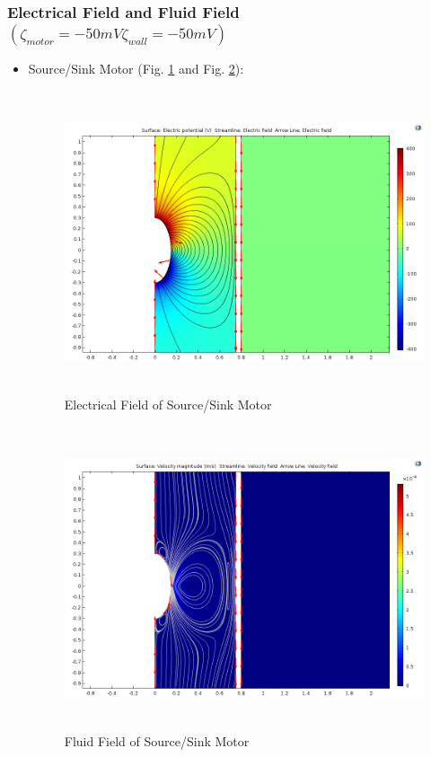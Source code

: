 \documentclass[fontsize=11pt, %
                             paper=a4, %
                             twoside, %
                             captions=tableheading,
                             index=totoc,
                             hyperref]{labbook}
\begin{document}
\begin{addmargin}[4cm]{0cm}
\subsubsection*{Electrical Field and Fluid Field $(\zeta_{motor}=-50mV \zeta_{wall}=-50 mV)$}
\begin{itemize}
\item Source/Sink Motor (Fig. \ref{2016-11-13-EFOSSM} and Fig. \ref{2016-11-13-FFOSSM}):
\begin{figure}
\centering
\includegraphics[width=\linewidth, height=3.5in]{2016-11-13-SourceSink-E.png}
\caption{Electrical Field of Source/Sink Motor}\label{2016-11-13-EFOSSM}
\end{figure}
\begin{figure}
\centering
\includegraphics[width=\linewidth, height=3.5in]{2016-11-13-SourceSink-V.png}
\caption{Fluid Field of Source/Sink Motor}\label{2016-11-13-FFOSSM}
\end{figure}

\end{itemize}
\end{addmargin}
\end{document}
